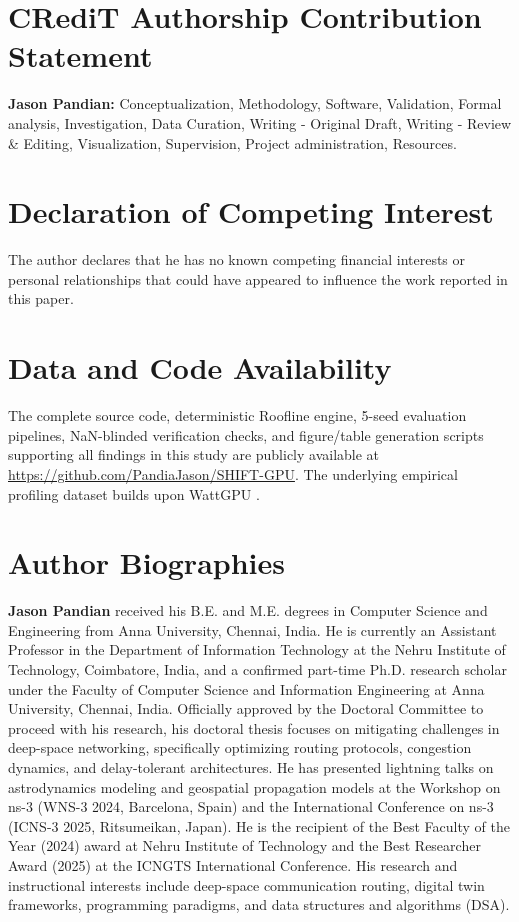 \documentclass[preprint,12pt]{elsarticle}
\begin{document}
\section*{CRediT Authorship Contribution Statement}
\textbf{Jason Pandian:} Conceptualization, Methodology, Software, Validation, Formal analysis, Investigation, Data Curation, Writing - Original Draft, Writing - Review \& Editing, Visualization, Supervision, Project administration, Resources.

\section*{Declaration of Competing Interest}
The author declares that he has no known competing financial interests or personal relationships that could have appeared to influence the work reported in this paper.

\section*{Data and Code Availability}
The complete source code, deterministic Roofline engine, 5-seed evaluation pipelines, NaN-blinded verification checks, and figure/table generation scripts supporting all findings in this study are publicly available at \url{https://github.com/PandiaJason/SHIFT-GPU}. The underlying empirical profiling dataset builds upon WattGPU \citep{fadel2026wattgpu}.

\section*{Author Biographies}

\noindent \textbf{Jason Pandian} received his B.E. and M.E. degrees in Computer Science and Engineering from Anna University, Chennai, India. He is currently an Assistant Professor in the Department of Information Technology at the Nehru Institute of Technology, Coimbatore, India, and a confirmed part-time Ph.D. research scholar under the Faculty of Computer Science and Information Engineering at Anna University, Chennai, India. Officially approved by the Doctoral Committee to proceed with his research, his doctoral thesis focuses on mitigating challenges in deep-space networking, specifically optimizing routing protocols, congestion dynamics, and delay-tolerant architectures. He has presented lightning talks on astrodynamics modeling and geospatial propagation models at the Workshop on ns-3 (WNS-3 2024, Barcelona, Spain) and the International Conference on ns-3 (ICNS-3 2025, Ritsumeikan, Japan). He is the recipient of the Best Faculty of the Year (2024) award at Nehru Institute of Technology and the Best Researcher Award (2025) at the ICNGTS International Conference. His research and instructional interests include deep-space communication routing, digital twin frameworks, programming paradigms, and data structures and algorithms (DSA).



\end{document}
